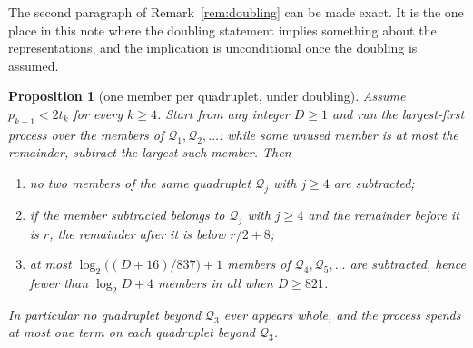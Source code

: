 \documentclass[11pt,a4paper]{article}
\newtheorem{proposition}{Proposition}
\newcommand{\Q}{\mathcal{Q}}
\begin{document}
The second paragraph of Remark~\ref{rem:doubling} can be made exact. It is
the one place in this note where the doubling statement implies something
about the representations, and the implication is unconditional once the
doubling is assumed.

\begin{proposition}[one member per quadruplet, under doubling]
\label{prop:halving}
Assume $p_{k+1}<2t_k$ for every $k\ge4$. Start from any integer $D\ge1$ and
run the largest-first process over the members of $\Q_1,\Q_2,\dots$:
while some unused member is at most the remainder, subtract the largest
such member. Then
\begin{enumerate}
\item[(i)] no two members of the same quadruplet $\Q_j$ with $j\ge4$ are
  subtracted;
\item[(ii)] if the member subtracted belongs to $\Q_j$ with $j\ge4$ and the
  remainder before it is $r$, the remainder after it is below $r/2+8$;
\item[(iii)] at most $\log_2\bigl((D+16)/837\bigr)+1$ members of
  $\Q_4,\Q_5,\dots$ are subtracted, hence fewer than $\log_2D+4$ members
  in all when $D\ge821$.
\end{enumerate}
In particular no quadruplet beyond $\Q_3$ ever appears whole, and the
process spends at most one term on each quadruplet beyond $\Q_3$.
\end{proposition}
\end{document}

